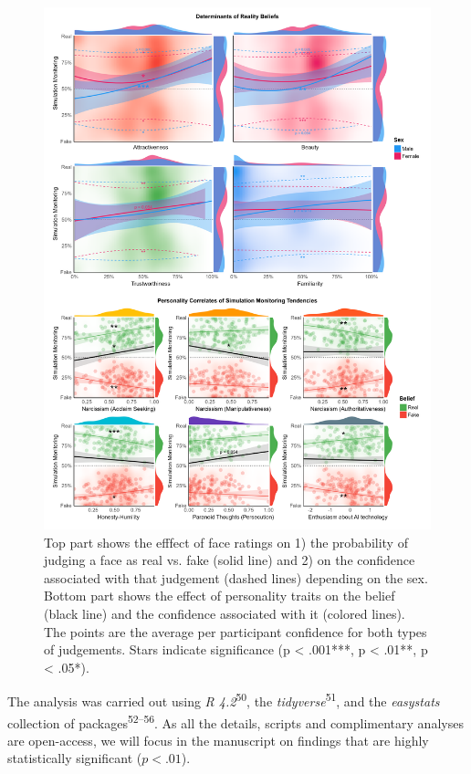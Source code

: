\documentclass[
  man,floatsintext]{apa6}
\begin{document}
\begin{figure}
\includegraphics[width=1\linewidth]{../figures/Figure2} \caption{Top part shows the efffect of face ratings on 1) the probability of judging a face as real vs. fake (solid line) and 2) on the confidence associated with that judgement (dashed lines) depending on the sex. Bottom part shows the effect of personality traits on the belief (black line) and the confidence associated with it (colored lines). The points are the average per participant confidence for both types of judgements. Stars indicate significance (p < .001***, p < .01**, p < .05*).}\label{fig:unnamed-chunk-3}
\end{figure}

The analysis was carried out using \emph{R 4.2}\textsuperscript{50}, the \emph{tidyverse}\textsuperscript{51}, and the \emph{easystats} collection of packages\textsuperscript{52--56}. As all the details, scripts and complimentary analyses are open-access, we will focus in the manuscript on findings that are highly statistically significant (\(p <.01\)).
\end{document}
